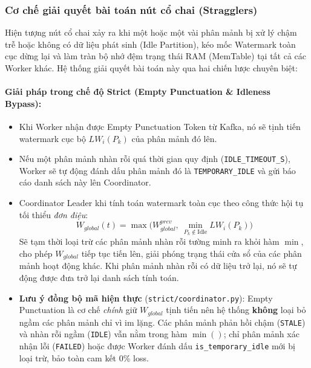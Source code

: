 \documentclass[12pt,a4paper]{article}
\begin{document}
\subsubsection{Cơ chế giải quyết bài toán nút cổ chai (Stragglers)}

Hiện tượng nút cổ chai xảy ra khi một hoặc một vài phân mảnh bị xử lý chậm trễ hoặc không có dữ liệu phát sinh (Idle Partition), kéo mốc Watermark toàn cục dừng lại và làm tràn bộ nhớ đệm trạng thái RAM (MemTable) tại tất cả các Worker khác. Hệ thống giải quyết bài toán này qua hai chiến lược chuyên biệt:

\paragraph{Giải pháp trong chế độ Strict (Empty Punctuation \& Idleness Bypass):}
\begin{itemize}[label={-}]
    \item Khi Worker nhận được Empty Punctuation Token từ Kafka, nó sẽ tịnh tiến watermark cục bộ $LW_i(P_k)$ của phân mảnh đó lên.
    \item Nếu một phân mảnh nhàn rỗi quá thời gian quy định (\texttt{IDLE\_TIMEOUT\_S}), Worker sẽ tự động đánh dấu phân mảnh đó là \texttt{TEMPORARY\_IDLE} và gửi báo cáo danh sách này lên Coordinator.
    \item Coordinator Leader khi tính toán watermark toàn cục theo công thức hội tụ tối thiểu \emph{đơn điệu}:
    {\large
    \begin{equation}
        \boxed{\displaystyle W_{global}(t) = \max\Big(W_{global}^{prev},\ \min_{P_k \notin \text{Idle}} LW_i(P_k)\Big)}
    \end{equation}
    }
    Sẽ tạm thời loại trừ các phân mảnh nhàn rỗi tường minh ra khỏi hàm $\min$, cho phép $W_{global}$ tiếp tục tiến lên, giải phóng trạng thái cửa sổ của các phân mảnh hoạt động khác. Khi phân mảnh nhàn rỗi có dữ liệu trở lại, nó sẽ tự động được đưa trở lại danh sách tính toán.
    \item \textbf{Lưu ý đồng bộ mã hiện thực} (\texttt{strict/coordinator.py}): Empty Punctuation là cơ chế \emph{chính} giữ $W_{global}$ tịnh tiến nên hệ thống \textbf{không} loại bỏ ngầm các phân mảnh chỉ vì im lặng. Các phân mảnh phản hồi chậm (\texttt{STALE}) và nhàn rỗi ngầm (\texttt{IDLE}) vẫn nằm trong hàm $\min()$; chỉ phân mảnh xác nhận lỗi (\texttt{FAILED}) hoặc được Worker đánh dấu \texttt{is\_temporary\_idle} mới bị loại trừ, bảo toàn cam kết 0\% loss.
\end{itemize}
\end{document}
